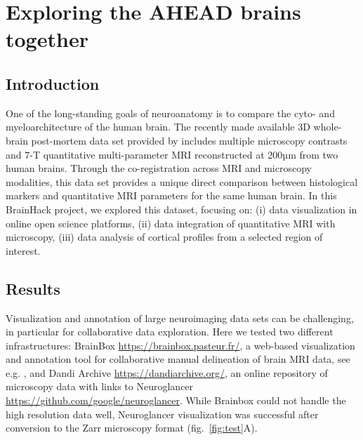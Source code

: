 \documentclass[../main.tex]{subfiles}
\begin{document}
\section{Exploring the AHEAD brains together}



\subsection{Introduction}
One of the long-standing goals of neuroanatomy is to compare the cyto- and myeloarchitecture of the human brain. The recently made available 3D whole-brain post-mortem data set provided by \textcite{Alkemade2022} includes multiple microscopy contrasts and 7-T quantitative multi-parameter MRI reconstructed at 200µm from two human brains. Through the co-registration across MRI and microscopy modalities, this data set provides a unique direct comparison between histological markers and quantitative MRI parameters for the same human brain. In this BrainHack project, we explored this dataset, focusing on: (i) data visualization in online open science platforms, (ii) data integration of quantitative MRI with microscopy, (iii) data analysis of cortical profiles from a selected region of interest. 


\subsection{Results}

Visualization and annotation of large neuroimaging data sets can be challenging, in particular for collaborative data exploration. Here we tested two different infrastructures: BrainBox \url{https://brainbox.pasteur.fr/}, a web-based visualization and annotation tool for collaborative manual delineation of brain MRI data, see e.g. \parencite{heuer_evolution_2019}, and Dandi Archive \url{https://dandiarchive.org/}, an online repository of microscopy data with links to Neuroglancer \url{https://github.com/google/neuroglancer}. While Brainbox could not handle the high resolution data well, Neuroglancer visualization was successful after conversion to the Zarr microscopy format (fig.~\ref{fig:test}A).
\end{document}
